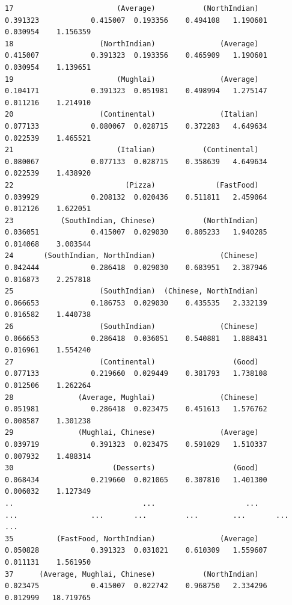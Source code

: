 \documentclass[11pt]{article} %
\begin{document}
\begin{lstlisting}
17                        (Average)           (NorthIndian)            0.391323            0.415007  0.193356    0.494108   1.190601  0.030954    1.156359
18                    (NorthIndian)               (Average)            0.415007            0.391323  0.193356    0.465909   1.190601  0.030954    1.139651
19                        (Mughlai)               (Average)            0.104171            0.391323  0.051981    0.498994   1.275147  0.011216    1.214910
20                    (Continental)               (Italian)            0.077133            0.080067  0.028715    0.372283   4.649634  0.022539    1.465521
21                        (Italian)           (Continental)            0.080067            0.077133  0.028715    0.358639   4.649634  0.022539    1.438920
22                          (Pizza)              (FastFood)            0.039929            0.208132  0.020436    0.511811   2.459064  0.012126    1.622051
23           (SouthIndian, Chinese)           (NorthIndian)            0.036051            0.415007  0.029030    0.805233   1.940285  0.014068    3.003544
24       (SouthIndian, NorthIndian)               (Chinese)            0.042444            0.286418  0.029030    0.683951   2.387946  0.016873    2.257818
25                    (SouthIndian)  (Chinese, NorthIndian)            0.066653            0.186753  0.029030    0.435535   2.332139  0.016582    1.440738
26                    (SouthIndian)               (Chinese)            0.066653            0.286418  0.036051    0.540881   1.888431  0.016961    1.554240
27                    (Continental)                  (Good)            0.077133            0.219660  0.029449    0.381793   1.738108  0.012506    1.262264
28               (Average, Mughlai)               (Chinese)            0.051981            0.286418  0.023475    0.451613   1.576762  0.008587    1.301238
29               (Mughlai, Chinese)               (Average)            0.039719            0.391323  0.023475    0.591029   1.510337  0.007932    1.488314
30                       (Desserts)                  (Good)            0.068434            0.219660  0.021065    0.307810   1.401300  0.006032    1.127349
..                              ...                     ...                 ...                 ...       ...         ...        ...       ...         ...
35          (FastFood, NorthIndian)               (Average)            0.050828            0.391323  0.031021    0.610309   1.559607  0.011131    1.561950
37      (Average, Mughlai, Chinese)           (NorthIndian)            0.023475            0.415007  0.022742    0.968750   2.334296  0.012999   18.719765

\end{lstlisting}
\end{document}
